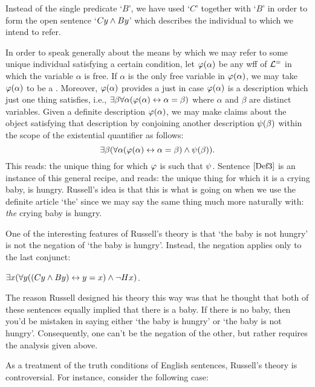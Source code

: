 Instead of the single predicate `$B$', we have used `$C$' together with `$B$' in order to form the open sentence `$Cy \wedge By$' which describes the individual to which we intend to refer.

In order to speak generally about the means by which we may refer to some unique individual satisfying a certain condition, let $\varphi(\alpha)$ be any wff of $\mathcal{L}^{=}$ in which the variable $\alpha$ is free. 
If $\alpha$ is the only free variable in $\varphi(\alpha)$, we may take $\varphi(\alpha)$ to be a .
Moreover, $\varphi(\alpha)$ provides a  just in case $\varphi(\alpha)$ is a description which just one thing satisfies, i.e., $\exists \beta\forall \alpha(\varphi(\alpha)\leftrightarrow \alpha = \beta)$ where $\alpha$ and $\beta$ are distinct variables.
Given a definite description $\varphi(\alpha)$, we may make claims about the object satisfying that description by conjoining another description $\psi(\beta)$ within the scope of the existential quantifier as follows: 
  $$\exists \beta(\forall \alpha(\varphi(\alpha)\leftrightarrow \alpha = \beta) \wedge \psi(\beta)).$$
This reads: the unique thing for which $\varphi$ is such that $\psi$.
Sentence $\ref{Def3}$ is an instance of this general recipe, and reads: the unique thing for which it is a crying baby, is hungry. 
Russell's idea is that this is what is going on when we use the definite article `the' since we may say the same thing much more naturally with: \textit{the} crying baby is hungry.

One of the interesting features of Russell's theory is that `the baby is not hungry' is not the negation of `the baby is hungry'.
Instead, the negation applies only to the last conjunct:

\begin{earg}
  \item[\ex{Def4}] $\exists x (\forall y ((Cy \wedge By) \leftrightarrow y = x) \wedge \neg Hx)$.
\end{earg}

The reason Russell designed his theory this way was that he thought that both of these sentences equally implied that there is a baby.
If there is no baby, then you'd be mistaken in saying either `the baby is hungry' or `the baby is not hungry'.
Consequently, one can't be the negation of the other, but rather requires the analysis given above.

As a treatment of the truth conditions of English sentences, Russell's theory is controversial.
For instance, consider the following case:

